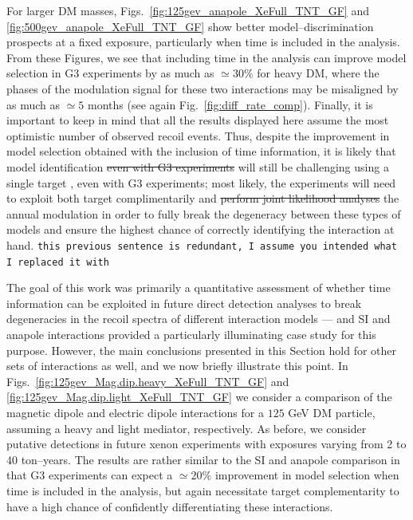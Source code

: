 \documentclass[11pt]{article}
\newcommand{\Fig}[1]{Fig.~\ref{#1}} \newcommand{\Figs}[2]{Figs.~\ref{#1} and \ref{#2}}
\newcommand{\sjwColor}{red}
\newcommand{\sjw}[1]{{\color{\sjwColor} #1}}
\newcommand{\sjwrm}[1]{{\color{\sjwColor}\protect\sout{#1}}}
\newcommand{\sjwtt}[1]{{\color{\sjwColor}\tt #1}}
\begin{document}
For larger DM masses, Figs.~\ref{fig:125gev_anapole_XeFull_TNT_GF} and \ref{fig:500gev_anapole_XeFull_TNT_GF} show better model--discrimination prospects at a fixed exposure, particularly when time is included in the analysis. From these Figures, we see that including time in the analysis can improve model selection in G3 experiments by as much as $\simeq 30\%$ for heavy DM, where the phases of the modulation signal for these two interactions may be misaligned by as much as $\simeq 5$ months (see again \Fig{fig:diff_rate_comp}). Finally, it is important to keep in mind that all the results displayed here assume the most optimistic number of observed recoil events. Thus, despite the improvement in model selection obtained with the inclusion of time information, it is likely that model identification \sjwrm{even with G3 experiments} will still be challenging using a single target\sjw{, even with G3 experiments}; most likely, the experiments will need to exploit \sjw{both} target complimentarily and \sjwrm{perform joint likelihood analyses} \sjw{the annual modulation} in order to fully break the degeneracy between these types of models and ensure the highest chance of correctly identifying the interaction at hand. \sjwtt{this previous sentence is redundant, I assume you intended what I replaced it with}

The goal of this work was primarily a quantitative assessment of whether time information can be exploited in future direct detection analyses to break degeneracies in the recoil spectra of different interaction models --- and SI and anapole interactions provided a particularly illuminating case study for this purpose. However, the main conclusions presented in this Section hold for other sets of interactions as well, and we now briefly illustrate this point. In \Figs{fig:125gev_Mag.dip.heavy_XeFull_TNT_GF}{fig:125gev_Mag.dip.light_XeFull_TNT_GF} we consider a comparison of the magnetic dipole and electric dipole interactions for a $125$ GeV DM particle, assuming a heavy and light mediator, respectively. As before, we consider putative detections in future xenon experiments with exposures varying from 2 to 40 ton--years. The results are rather similar to the SI and anapole comparison in that G3 experiments can expect a $\simeq 20\%$ improvement in model selection when time is included in the analysis, but again necessitate target complementarity to have a high chance of confidently differentiating these interactions.

\end{document}

